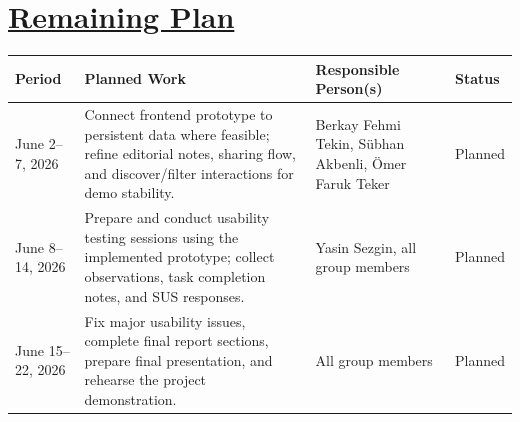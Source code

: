 \documentclass[12pt,a4paper]{article}
\begin{document}
\newpage
\section*{\underline{Remaining Plan}}

{\small
\renewcommand{\arraystretch}{1.25}
\begin{longtable}{@{}p{}p{}p{}p{}@{}}
\toprule
\textbf{Period} & \textbf{Planned Work} & \textbf{Responsible Person(s)} & \textbf{Status} \\
\midrule
June 2--7, 2026
  & Connect frontend prototype to persistent data where feasible; refine editorial notes, sharing flow, and discover/filter interactions for demo stability.
  & Berkay Fehmi Tekin, Sübhan Akbenli, Ömer Faruk Teker
  & Planned \\
June 8--14, 2026
  & Prepare and conduct usability testing sessions using the implemented prototype; collect observations, task completion notes, and SUS responses.
  & Yasin Sezgin, all group members
  & Planned \\
June 15--22, 2026
  & Fix major usability issues, complete final report sections, prepare final presentation, and rehearse the project demonstration.
  & All group members
  & Planned \\
\bottomrule
\end{longtable}
}
\end{document}
